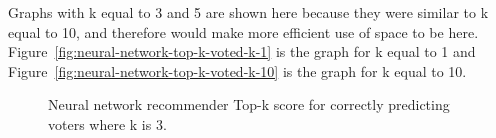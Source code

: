 Graphs with k equal to 3 and 5 are shown here because they were similar to k equal to 10, and therefore would make more efficient use of space to be here. Figure~\ref{fig:neural-network-top-k-voted-k-1} is the graph for k equal to 1 and Figure~\ref{fig:neural-network-top-k-voted-k-10} is the graph for k equal to 10.

\begin{figure}[H]%
    \centering
    \caption{Neural network recommender Top-k score for correctly predicting voters where k is 3.}%
    \label{fig:neural-network-top-k-voted-k-3-appendix-c}%
\end{figure}

